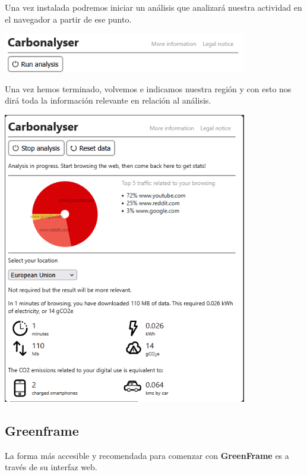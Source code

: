 \documentclass[12pt,a4paper]{report}
\begin{document}
Una vez instalada podremos iniciar un análisis que analizará nuestra actividad
en el navegador a partir de ese punto.

\begin{center}
  \includegraphics[width=0.8\textwidth]{imagenes/Carbonalyser_2.png}
\end{center}

Una vez hemos terminado, volvemos e indicamos nuestra región y con esto nos
dirá toda la información relevante en relación al análisis.

\begin{center}
  \includegraphics[width=0.8\textwidth]{imagenes/Carbonalyser_3.png}
\end{center}

\subsection{Greenframe}
La forma más accesible y recomendada para comenzar con \textbf{GreenFrame} es a
través de su interfaz web.
\end{document}
